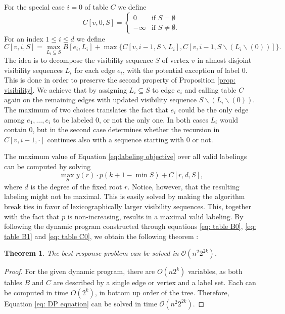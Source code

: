 \documentclass[11pt]{article}
\newtheorem{theorem}{Theorem}[section]
\newcommand\+{\mkern2mu}
\begin{document}
For the special case $i=0$ of table $C$ we define 
\begin{equation}  \label{eq: table C0}
C[v,0,S]=
\begin{cases}
0 &\text{if } S=\emptyset \\
-\infty & \text{if }S\neq \emptyset.
\end{cases}
\end{equation}
For an index $1\leq i\leq d$ we define
\begin{equation} \label{eq: table C1}
    C[v, i, S] = 
        \max_{L_i \subseteq S} B[e_i, L_i] + 
        \max\{ C[v, i-1, S \backslash L_i ], C[v, i-1, S \backslash (L_i \backslash (0))]\}.
\end{equation}
The idea is to decompose the visibility sequence $S$ of vertex $v$ in almost disjoint visibility sequences $L_i$ for each edge $e_i$, with the potential exception of label $0$. This is done in order to preserve the second property of Proposition \ref{prop: visibility}. We achieve that by assigning $L_i \subseteq S$ to edge $e_i$ and calling table $C$ again on the remaining edges with updated visibility sequence $S \backslash (L_i \backslash (0))$. The maximum of two choices translates the fact that $e_i$ could be the only edge among $e_1,\ldots,e_i$ to be labeled 0, or not the only one. In both cases $L_i$ would contain $0$, but in the second case determines whether the recursion in $C[v,i-1,\cdot]$ continues also with a sequence starting with 0 or not.

The maximum value of Equation \eqref{eq:labeling objective} over all valid labelings can be computed by solving
\begin{equation} \label{eq: DP equation}
\max_{S} y(r) \cdot p(k+1-\min S) +  C[r, d, S],    
\end{equation}
where $d$ is the degree of the fixed root $r$. Notice, however, that the resulting labeling might not be maximal. This is easily solved by making the algorithm break ties in favor of lexicographically larger visibility sequences. This, together with the fact that $p$ is non-increasing, results in a maximal valid labeling. By following the dynamic program constructed through equations \ref{eq: table B0}, \ref{eq: table B1} and \ref{eq: table C0}, we obtain the following theorem :

\begin{theorem}
    The best-response problem can be solved in $\mathcal{O}(n^2 2^{2k})$.
\end{theorem}
\begin{proof}
For the given dynamic program, there are $O(n 2^k)$ variables, as both tables $B$ and $C$ are described by a single edge or vertex and a label set. Each can be computed in time $O(2^k)$, in bottom up order of the tree. Therefore, Equation \ref{eq: DP equation} can be solved in time $\mathcal{O}(n^2 2^{2k})$. 
\end{proof}
\end{document}
